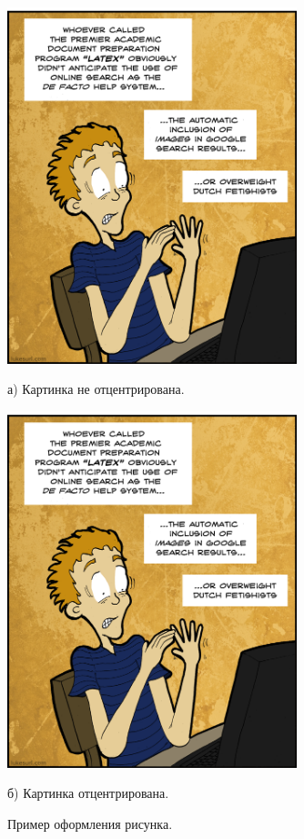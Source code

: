 \documentclass[14pt,russian]{scrartcl}
\begin{document}
\begin{figure}[!htb]
\centering
  \begin{minipage}[t]{.4\textwidth}
\includegraphics[width=0.75\textwidth]{google_latex.png}
  \caption*{а) Картинка не отцентрирована.}
  \end{minipage}
  \noindent
  \begin{minipage}[t]{.55\textwidth}
  \centering
\includegraphics[width=0.75\textwidth]{google_latex.png}
  \caption*{б) Картинка отцентрирована.}
  \end{minipage}
\caption{Пример оформления рисунка.}
\label{fig:example1}
\end{figure}
\end{document}
